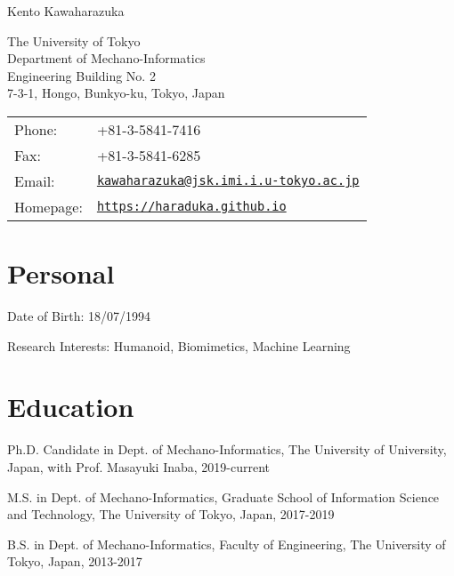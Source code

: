 \documentclass[letterpaper]{article}
\def\name{Kento Kawaharazuka}
\renewenvironment{itemize}{
  \begin{list}{}{
    \setlength{\leftmargin}{1.5em}
  }
}{
  \end{list}
}
\begin{document}
{\huge \name}

\vspace{0.25in}

\begin{minipage}{0.45\linewidth}
  {The University of Tokyo} \\
  Department of Mechano-Informatics \\
  Engineering Building No. 2 \\
  7-3-1, Hongo, Bunkyo-ku, Tokyo, Japan
\end{minipage}
\begin{minipage}{0.45\linewidth}
  \begin{tabular}{ll}
    Phone: & +81-3-5841-7416 \\
    Fax: &  +81-3-5841-6285 \\
    Email: & \href{mailto:kawaharazuka@jsk.imi.i.u-tokyo.ac.jp}{\tt kawaharazuka@jsk.imi.i.u-tokyo.ac.jp} \\
    Homepage: & \href{https://haraduka.github.io}{\tt https://haraduka.github.io} \\
  \end{tabular}
\end{minipage}


\section*{Personal}

\begin{itemize}
    \item Date of Birth: 18/07/1994
    \item Research Interests: Humanoid, Biomimetics, Machine Learning
\end{itemize}


\section*{Education}

\begin{itemize}
  \item Ph.D. Candidate in Dept. of Mechano-Informatics, The University of University, Japan, with Prof. Masayuki Inaba, 2019-current
  \item M.S. in Dept. of Mechano-Informatics, Graduate School of Information Science and Technology, The University of Tokyo, Japan, 2017-2019
  \item B.S. in Dept. of Mechano-Informatics, Faculty of Engineering, The University of Tokyo, Japan, 2013-2017
\end{itemize}
\end{document}
